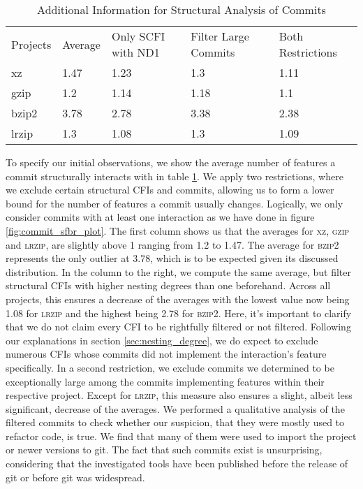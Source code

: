 \begin{table}[t]
\caption{Additional Information for Structural Analysis of Commits}
\label{tab:commit_sfbr_table}
\begin{tabular}{lllll}
 Projects & Average & Only SCFI with ND1 & Filter Large Commits & Both Restrictions \\
  xz    & 1.47 & 1.23 & 1.3  & 1.11 \\
  gzip  & 1.2  & 1.14 & 1.18 & 1.1 \\
  bzip2 & 3.78 & 2.78 & 3.38 & 2.38 \\
  lrzip & 1.3  & 1.08 & 1.3  & 1.09 \\
\end{tabular}
\end{table}

To specify our initial observations, we show the average number of features a commit structurally interacts with in table \ref{tab:commit_sfbr_table}.
We apply two restrictions, where we exclude certain structural CFIs and commits, allowing us to form a lower bound for the number of features a commit usually changes.
Logically, we only consider commits with at least one interaction as we have done in figure \ref{fig:commit_sfbr_plot}.
The first column shows us that the averages for \textsc{xz}, \textsc{gzip} and \textsc{lrzip}, are slightly above 1 ranging from 1.2 to 1.47.
The average for \textsc{bzip2} represents the only outlier at 3.78, which is to be expected given its discussed distribution.
In the column to the right, we compute the same average, but filter structural CFIs with higher nesting degrees than one beforehand.
Across all projects, this ensures a decrease of the averages with the lowest value now being 1.08 for \textsc{lrzip} and the highest being 2.78 for \textsc{bzip2}.
Here, it's important to clarify that we do not claim every CFI to be rightfully filtered or not filtered.
Following our explanations in section \ref{sec:nesting_degree}, we do expect to exclude numerous CFIs whose commits did not implement the interaction's feature specifically.
In a second restriction, we exclude commits we determined to be exceptionally large among the commits implementing features within their respective project.
Except for \textsc{lrzip}, this measure also ensures a slight, albeit less significant, decrease of the averages. 
We performed a qualitative analysis of the filtered commits to check whether our suspicion, that they were mostly used to refactor code, is true.
We find that many of them were used to import the project or newer versions to git.
The fact that such commits exist is unsurprising, considering that the investigated tools have been published before the release of git or before git was widespread.
